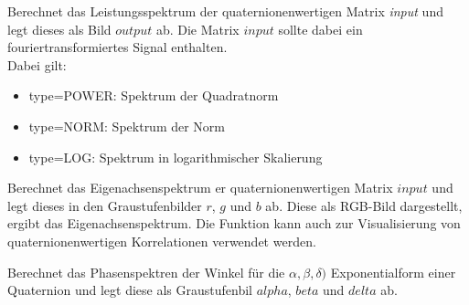 \descr
{
Berechnet das Leistungsspektrum der quaternionenwertigen Matrix \textit{input} und
legt dieses als Bild $output$ ab. Die Matrix $input$ sollte dabei ein
fouriertransformiertes Signal enthalten.\\
Dabei gilt:
\begin{itemize}
\item type=POWER: Spektrum der Quadratnorm
\item type=NORM: Spektrum der Norm
\item type=LOG: Spektrum in logarithmischer Skalierung
\end{itemize}
}


\descr
{Berechnet das Eigenachsenspektrum er quaternionenwertigen Matrix $input$ und
legt dieses in den Graustufenbilder $r$, $g$ und $b$ ab.
Diese als RGB-Bild dargestellt, ergibt das Eigenachsenspektrum. Die Funktion 
kann auch zur Visualisierung von quaternionenwertigen Korrelationen verwendet werden.}

\descr
{ 
Berechnet das Phasenspektren der Winkel für die $\alpha,\beta,\delta)$ Exponentialform
einer Quaternion und legt diese als Graustufenbil $alpha$, $beta$ und
$delta$ ab.
}
